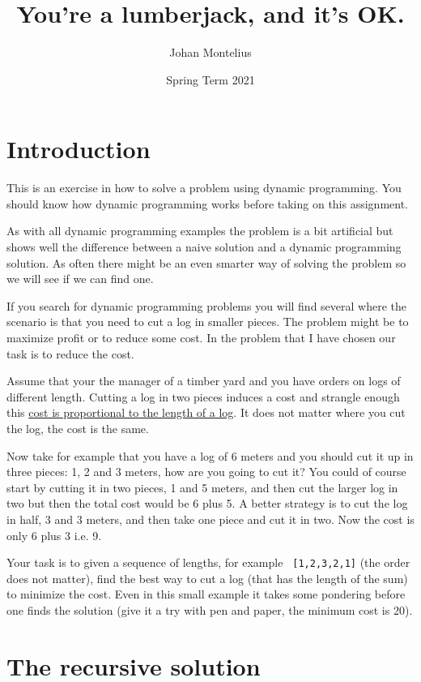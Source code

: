 \documentclass[a4paper,11pt]{article}
\begin{document}
\title{
    \textbf{You're a lumberjack, and it's OK.}
}
\author{Johan Montelius}
\date{Spring Term 2021}
\maketitle
{}

\section*{Introduction}

This is an exercise in how to solve a problem using dynamic
programming. You should know how dynamic programming works before
taking on this assignment.

As with all dynamic programming examples the problem is a bit
artificial but shows well the difference between a naive solution and
a dynamic programming solution. As often there might be an even
smarter way of solving the problem so we will see if we can find one.

If you search for dynamic programming problems you will find several
where the scenario is that you need to cut a log in smaller
pieces. The problem might be to maximize profit or to reduce some
cost. In the problem that I have chosen our task is to reduce the cost.

Assume that your the manager of a timber yard and you have orders on
logs of different length. Cutting a log in two pieces induces a cost
and strangle enough this \underline{cost is proportional to the length of a
log}. It does not matter where you cut the log, the cost is the same.

Now take for example that you have a log of 6 meters and you should
cut it up in three pieces: 1, 2 and 3 meters, how are you going to cut
it? You could of course start by cutting it in two pieces, 1 and 5
meters, and then cut the larger log in two but then the total cost
would be 6 plus 5. A better strategy is to cut the log in half, 3 and 3
meters, and then take one piece and cut it in two. Now the
cost is only 6 plus 3 i.e. 9.

Your task is to given a sequence of lengths, for example {\tt
  [1,2,3,2,1]} (the order does not matter), find the best way to cut a
log (that has the length of the sum) to minimize the cost. Even in
this small example it takes some pondering before one finds the
solution (give it a try with pen and paper, the minimum cost is 20).


\section*{The recursive solution}
\end{document}
